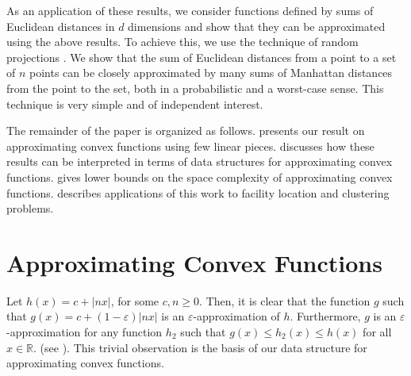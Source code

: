 \documentclass[charterfonts,lotsofwhite]{patmorin}
\newcommand{\eps}{\varepsilon}
\newcommand{\Real}{\mathbb{R}}
\begin{document}
As an application of these results, we consider functions defined by
sums of Euclidean distances in $d$ dimensions and show that they can
be approximated using the above results.  To achieve this, we use the
technique of random projections \cite{i01,k97}.  We show that the sum
of Euclidean distances from a point to a set of $n$ points can be
closely approximated by many sums of Manhattan distances from the
point to the set, both in a probabilistic and a worst-case sense.
This technique is very simple and of independent interest.

The remainder of the paper is organized as follows.  
presents our result on approximating convex functions using few linear
pieces.   discusses how these results can be interpreted in
terms of data structures for approximating convex functions.
 gives lower bounds on the space complexity of
approximating convex functions.   describes
applications of this work to facility location and clustering
problems.

\section{Approximating Convex Functions}

Let $h(x)=c+|nx|$, for some $c,n\ge 0$.  Then, it is clear that the
function $g$ such that $g(x)=c+(1-\eps)|nx|$ is an
$\eps$-approximation of $h$.  Furthermore, $g$ is an
$\eps$-approximation for any function $h_2$ such that $g(x)\le
h_2(x)\le h(x)$ for all $x\in\Real$. (see ).  This
trivial observation is the basis of our data structure for
approximating convex functions.
\end{document}
